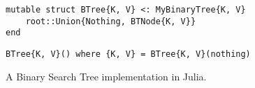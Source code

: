 \documentclass[a4paper, 11pt]{article}
\begin{document}
    \begin{figure}[h]
        \centering
    \begin{verbatim}
mutable struct BTree{K, V} <: MyBinaryTree{K, V}
    root::Union{Nothing, BTNode{K, V}}
end
    \end{verbatim}
    \begin{verbatim}
BTree{K, V}() where {K, V} = BTree{K, V}(nothing)
    \end{verbatim}
    \caption{A Binary Search Tree implementation in Julia.}
    \label{code:binarytree}
    \end{figure}

    \clearpage
\end{document}
